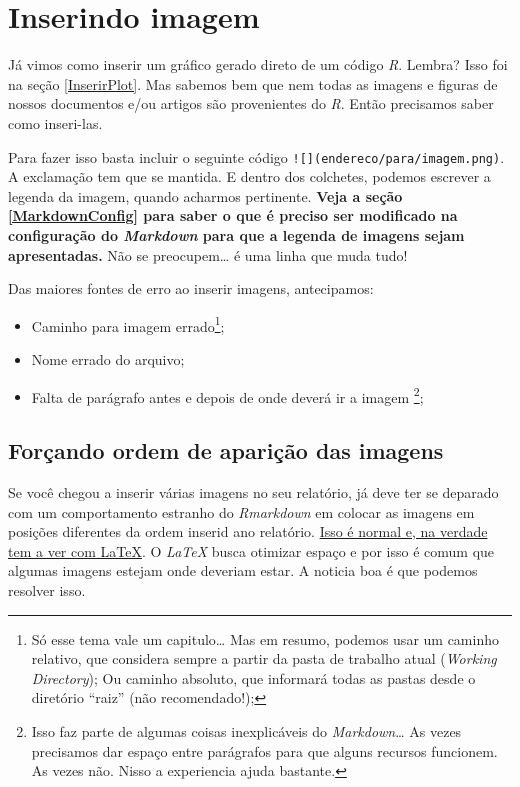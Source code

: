 \documentclass[]{book}
\providecommand{\tightlist}{%
  \setlength{\itemsep}{0pt}\setlength{\parskip}{0pt}}
\begin{document}
\hypertarget{InserindoImagem}{%
\chapter{Inserindo imagem}\label{InserindoImagem}}

Já vimos como inserir um gráfico gerado direto de um código \emph{R}. Lembra? Isso foi na seção \ref{InserirPlot}. Mas sabemos bem que nem todas as imagens e figuras de nossos documentos e/ou artigos são provenientes do \emph{R}. Então precisamos saber como inseri-las.

Para fazer isso basta incluir o seguinte código \texttt{!{[}{]}(endereco/para/imagem.png)}. A exclamação tem que se mantida. E dentro dos colchetes, podemos escrever a legenda da imagem, quando acharmos pertinente. \textbf{Veja a seção \ref{MarkdownConfig} para saber o que é preciso ser modificado na configuração do \emph{Markdown} para que a legenda de imagens sejam apresentadas.} Não se preocupem\ldots{} é uma linha que muda tudo!

Das maiores fontes de erro ao inserir imagens, antecipamos:

\begin{itemize}
\tightlist
\item
  Caminho para imagem errado\footnote{Só esse tema vale um capitulo\ldots{} Mas em resumo, podemos usar um caminho relativo, que considera sempre a partir da pasta de trabalho atual (\emph{Working Directory}); Ou caminho absoluto, que informará todas as pastas desde o diretório ``raiz'' (não recomendado!);};\\
\item
  Nome errado do arquivo;\\
\item
  Falta de parágrafo antes e depois de onde deverá ir a imagem \footnote{Isso faz parte de algumas coisas inexplicáveis do \emph{Markdown}\ldots{} As vezes precisamos dar espaço entre parágrafos para que alguns recursos funcionem. As vezes não. Nisso a experiencia ajuda bastante.};
\end{itemize}

\hypertarget{foruxe7ando-ordem-de-apariuxe7uxe3o-das-imagens}{%
\section{Forçando ordem de aparição das imagens}\label{foruxe7ando-ordem-de-apariuxe7uxe3o-das-imagens}}

Se você chegou a inserir várias imagens no seu relatório, já deve ter se deparado com um comportamento estranho do \emph{Rmarkdown} em colocar as imagens em posições diferentes da ordem inserid ano relatório. \href{https://bookdown.org/yihui/rmarkdown-cookbook/figure-placement.html}{Isso é normal e, na verdade tem a ver com LaTeX}. O \emph{LaTeX} busca otimizar espaço e por isso é comum que algumas imagens estejam onde deveriam estar.
A noticia boa é que podemos resolver isso.
\end{document}
